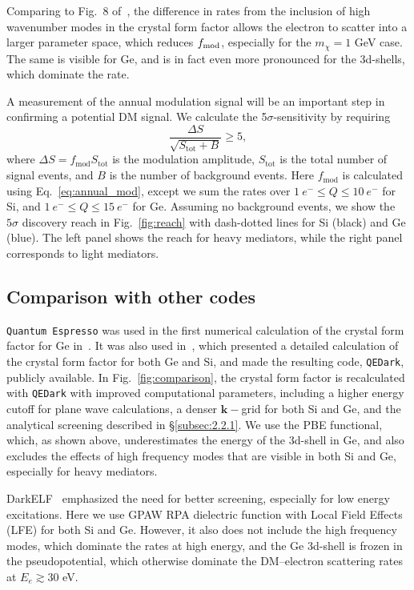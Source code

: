 \documentclass[
    prd, twocolumn, superscriptaddress, nofootinbib, amsmath, amssymb,
    aps, floatfix,preprintnumbers
]{revtex4-2}
\begin{document}
    Comparing to Fig.~8 of~\cite{Essig:2015cda}, the difference in rates from the inclusion of high wavenumber modes in the crystal form factor allows the electron to scatter into a larger parameter space, which reduces $f_{\rm mod}$, especially for the $m_\chi = 1$ GeV case. The same is visible for Ge, and is in fact even more pronounced for the 3d-shells, which dominate the rate.
    
    A measurement of the annual modulation signal will be an important step in confirming a potential DM signal.  We calculate the 5$\sigma$-sensitivity by requiring 
    \begin{equation}
        \frac{\Delta S}{\sqrt{S_\mathrm{tot} + B}}\geq 5,
    \end{equation}
    where $\Delta S = f_\mathrm{mod}S_\mathrm{tot}$ is the modulation amplitude, $S_\mathrm{tot}$ is the total number of signal events, and $B$ is the number of background events. Here $f_\mathrm{mod}$ is calculated using Eq.~\eqref{eq:annual_mod}, except we sum the rates over $1\ e^-\leq Q\leq 10\ e^-$ for Si, and $1\ e^-\leq Q\leq 15\ e^-$ for Ge. Assuming no background events, we show the $5\sigma$ discovery reach in Fig.~\ref{fig:reach} with dash-dotted lines for Si (black) and Ge (blue). The left panel shows the reach for heavy mediators, while the right panel corresponds to light mediators.
    
    \subsection{Comparison with other codes}\label{sec:5}
    
    \texttt{Quantum Espresso} was used in the first numerical calculation of the crystal form factor for Ge in~\cite{Essig:2011nj}.  It was also used in~\cite{Essig:2015cda}, which presented a detailed calculation of the crystal form factor for both Ge and Si, and made the resulting code, \texttt{QEDark}, publicly available.  In Fig.~\ref{fig:comparison}, the crystal form factor is recalculated with \texttt{QEDark} with improved computational parameters, including a higher energy cutoff for plane wave calculations, a denser $\mathbf{k}-$grid for both Si and Ge, and the analytical screening described in \S \ref{subsec:2.2.1}. We use the PBE functional, which, as shown above, underestimates the energy of the 3d-shell in Ge, and also excludes the effects of high frequency modes that are visible in both Si and Ge, especially for heavy mediators. 
    
    DarkELF~\cite{Knapen2021Diel} emphasized the need for better screening, especially for low energy excitations. Here we use GPAW RPA dielectric function with Local Field Effects (LFE) for both Si and Ge. However, it also does not include the high frequency modes, which dominate the rates at high energy, and the Ge 3d-shell is frozen in the pseudopotential, which otherwise dominate the DM--electron scattering rates at $E_e\gtrsim 30$ eV. 
    
\end{document}
